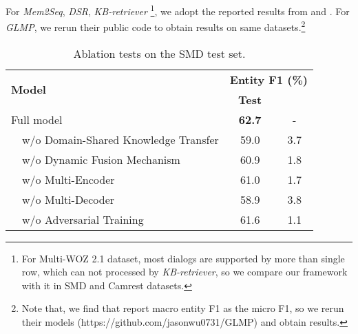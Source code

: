 \documentclass[11pt,a4paper]{article}
\begin{document}
For \textit{Mem2Seq}, \textit{DSR}, \textit{KB-retriever} \footnote{For Multi-WOZ 2.1 dataset, most dialogs are supported by more than single row, which can not processed by \textit{KB-retriever}, so we compare our framework with it in SMD and Camrest datasets.}, we adopt the reported results from  and .
For \textit{GLMP}, we rerun their public code to obtain results on same datasets.\footnote{Note that, we find that  report macro entity F1 as the micro F1, so we rerun their models (https://github.com/jasonwu0731/GLMP) and obtain results.} \

\begin{table}[t]
	\centering
	\begin{adjustbox}{width=0.45\textwidth}
		\begin{tabular}{l|c|c}
			\hline
			\multirow{2}{*}{\textbf{Model}} & \multicolumn{2}{c}{\textbf{Entity F1 (\%)}} \\ \cline{2-3} 
			& \textbf{Test} &  \\ \hline \hline
			Full model & \textbf{62.7} & - \\ \hline
			\hline
~~w/o Domain-Shared Knowledge Transfer & 59.0 & 3.7 \\ \hline
			~~w/o Dynamic Fusion Mechanism & 60.9 & 1.8 \\ \hline
			~~w/o Multi-Encoder & 61.0 & 1.7 \\ \hline
			~~w/o Multi-Decoder & 58.9 & 3.8 \\ \hline
			~~w/o Adversarial Training & 61.6 & 1.1 \\ \hline
		
		\end{tabular}
	\end{adjustbox}
	\caption{Ablation tests on the
		SMD test set. 
}
	\label{tab:ablation}
\end{table}
\end{document}
